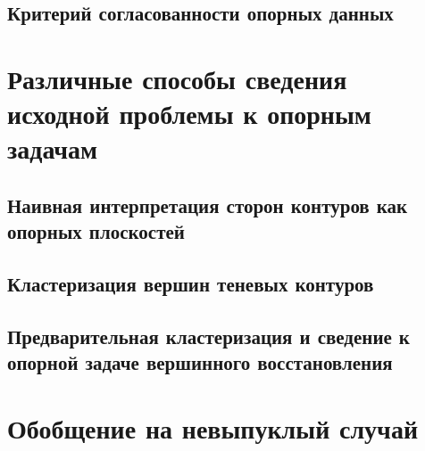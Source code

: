 \documentclass[a4paper, 12pt, titlepage]{article}
\theoremstyle{definition}
\theoremstyle{plain}
\theoremstyle{plain}
\begin{document}
\subsection{Критерий согласованности опорных данных}


\section{Различные способы сведения исходной проблемы к опорным задачам}

\subsection{Наивная интерпретация сторон контуров как опорных плоскостей}

\subsection{Кластеризация вершин теневых контуров}

\subsection{Предварительная кластеризация и сведение к опорной задаче
вершинного восстановления}




\section{Обобщение на невыпуклый случай}

\newpage


\end{document}
